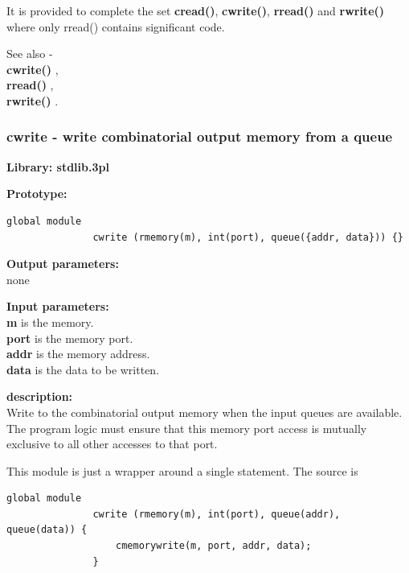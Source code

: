             It is provided to complete the set {\bf cread()}, {\bf cwrite()},
            {\bf rread()} and {\bf rwrite()} where only rread() contains
            significant code.
            
            See also - \\
            {\bf cwrite()} , \\
            {\bf rread()} , \\
            {\bf rwrite()} .

    
        \subsubsection{cwrite - write combinatorial output memory from a
                                                    queue}\label{sec:lmcwrite}

            {\bf Library: stdlib.3pl}

            {\bf Prototype:} \\
            \vsp
            \begin{lstlisting}[gobble=12, language=threepl]
               global module
               cwrite (rmemory(m), int(port), queue({addr, data})) {}
            \end{lstlisting}

            {\bf Output parameters:} \\
            none

            {\bf Input parameters:} \\ 
            {\bf m} is the memory.\\
            {\bf port} is the memory port.\\
            {\bf addr} is the memory address.\\            
            {\bf data} is the data to be written.

            {\bf description:} \\
            Write to the combinatorial output memory when the input queues are
            available. The program logic must ensure that this memory port
            access is mutually exclusive to all other accesses to that port.
            
            This module is just a wrapper around a single statement. The source
            is
            \begin{lstlisting}[gobble=12, language=threepl]
               global module
               cwrite (rmemory(m), int(port), queue(addr), queue(data)) {
                   cmemorywrite(m, port, addr, data);
               }
            \end{lstlisting}
                        
